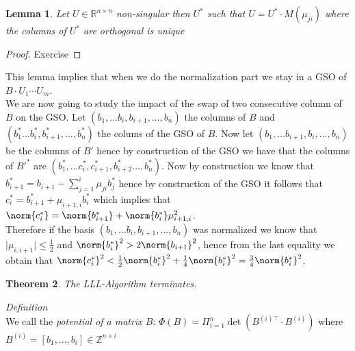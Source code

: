 \documentclass[a4paper,11pt,american]{article}
\newcommand{\R}{\mathbb{R}}
\newcommand{\Z}{\mathbb{Z}}
\theoremstyle{plain}
\newtheorem{theorem}{Theorem}
\newtheorem{lemma}[theorem]{Lemma}
\theoremstyle{definition}
\begin{document}
\begin{lemma}
    Let $U\in\R^{n\times n}$ non-singular then $U^*$ such that $U=U^*\cdot M(\mu_{ji})$ where the columns of $U^*$ are orthogonal is unique 
\end{lemma}
\begin{proof}
    Exercise
\end{proof}
This lemma implies that when we do the normalization part we stay in a GSO of $B\cdot U_1\cdots U_m$.\\
We are now going to study the impact of the swap of two consecutive column of $B$ on the GSO. Let $(b_1,\dots b_i,b_{i+1},\dots,b_n)$ the columns of $B$ and $(b_1^*\dots b_i^*,b_{i+1}^*,\dots,b_n^*)$ the colums of the GSO of $B$. Now let $(b_1,\dots b_{i+1},b_{i},\dots,b_n)$ be the columns of $B'$ hence by construction of the GSO we have that the columns of $B'^*$ are $(b_1^*,\dots c_i^*,c_{i+1}^*,b_{i+2}^*\dots,b_n^*)$. Now by construction we know that $b_{i+1}^*=b_{i+1}-\sum_{j=1}^i\mu_{ji}b_j^*$ hence by construction of the GSO it follows that $c_i^*=b_{i+1}^*+\mu_{i+1,i}b_i^*$ which implies that $\norm{c_i^*}=\norm {b_{i+1}^*}+\norm{b_i^*}\mu_{i+1,i}^2$.\\ Therefore if the basis $(b_1,\dots b_i,b_{i+1},\dots,b_n)$ was normalized we know that $\vert\mu_{i,i+1}\vert\leq \frac{1}{2}$ and $\norm{b_i^*}^2> 2\norm{b_{i+1}}^2$, hence from the last equality we obtain that $\norm{c_i^*}^2<\frac{1}{2}\norm{b_i^*}^2+\frac{1}{4}\norm{b_i^*}^2=\frac{3}{4}\norm{b_i^*}^2$.\\
\begin{theorem}
    The LLL-Algorithm terminates.
\end{theorem}
\emph{Definition}\\
We call the \emph{potential of a matrix $B$}: $\Phi(B)=\Pi^n_{i=1} \det(B^{(i)\top}\cdot B^{(i)})$ where $B^{(i)}=[b_1,\dots,b_i]\in\Z^{n\times i}$
\end{document}

